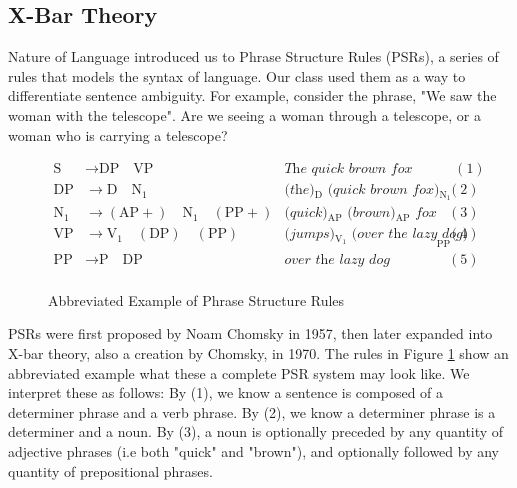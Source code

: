 \documentclass[runningheads]{llncs}
\begin{document}
\subsection{X-Bar Theory}
Nature of Language introduced us to Phrase Structure Rules (PSRs), a series of rules that models the syntax of language. Our class used them as a way to differentiate sentence ambiguity. %
For example, consider the phrase, "We saw the woman with the telescope". Are we seeing a woman through a telescope, or a woman who is carrying a telescope?

\begin{figure}
    \[
			\begin{array}{rlrr}
				\text{S}  &\rightarrow \text{DP} \quad \text{VP}&\textit{The quick brown fox jumps over the lazy dog} &\ \ (1) \\
				\text{DP}  &\rightarrow \text{D} \quad \text{N}_1&\textit{(the)$_\text{D}$ (quick brown fox)$_{\text{N}_1}$} & (2) \\
				\text{N}_1 &\rightarrow (\text{AP}+) \quad \text{N}_1 \quad (\text{PP}+)&\textit{(quick)$_\text{AP}$ (brown)$_\text{AP}$ fox} & (3)\\
				\text{VP} &\rightarrow \text{V}_1 \quad (\text{DP}) \quad (\text{PP})&\textit{(jumps)$_{\text{V}_1}$ (over the lazy dog)}_{\text{PP}} & (4)\\
				\text{PP} &\rightarrow \text{P} \quad \text{DP}&\textit{over the lazy dog} & (5)\\
    \end{array}
	\]
    \caption{Abbreviated Example of Phrase Structure Rules}
		\label{fig:psr}
\end{figure}
PSRs were first proposed by Noam Chomsky in 1957, then later expanded into X-bar theory, also a creation by Chomsky, in 1970.\cite{chomsky1957}\cite{chomsky1970}
The rules in Figure \ref{fig:psr} show an abbreviated example what these a complete PSR system may look like. We interpret these as follows: By (1), we know a sentence is composed of a determiner phrase and a verb phrase. By (2), we know a determiner phrase is a determiner and a noun. By (3), a noun is optionally preceded by any quantity of adjective phrases (i.e both "quick" and "brown"), and optionally followed by any quantity of prepositional phrases.
\end{document}
